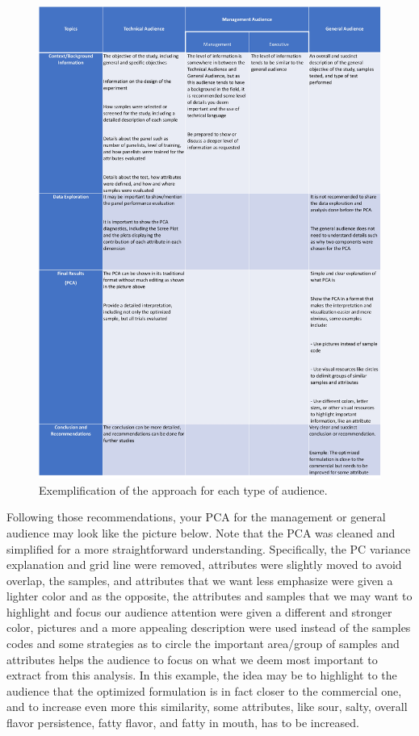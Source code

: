 \documentclass[
]{book}
\begin{document}
\begin{figure}

{\centering \includegraphics[width=63.53in]{images/table_value_delivery} 

}

\caption{Exemplification of the approach for each type of audience.}\label{fig:table}
\end{figure}

Following those recommendations, your PCA for the management or general audience may look like the picture below. Note that the PCA was cleaned and simplified for a more straightforward understanding. Specifically, the PC variance explanation and grid line were removed, attributes were slightly moved to avoid overlap, the samples, and attributes that we want less emphasize were given a lighter color and as the opposite, the attributes and samples that we may want to highlight and focus our audience attention were given a different and stronger color, pictures and a more appealing description were used instead of the samples codes and some strategies as to circle the important area/group of samples and attributes helps the audience to focus on what we deem most important to extract from this analysis. In this example, the idea may be to highlight to the audience that the optimized formulation is in fact closer to the commercial one, and to increase even more this similarity, some attributes, like sour, salty, overall flavor persistence, fatty flavor, and fatty in mouth, has to be increased.
\end{document}
